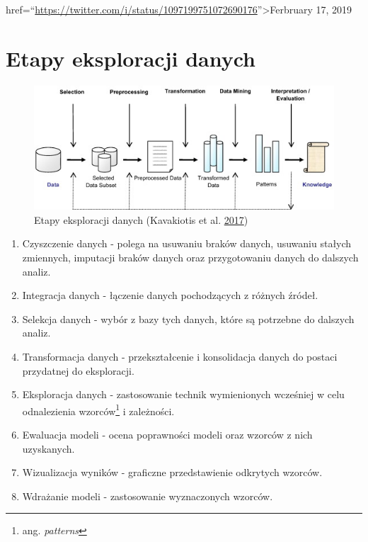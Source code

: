\documentclass[]{book}
\providecommand{\tightlist}{%
  \setlength{\itemsep}{0pt}\setlength{\parskip}{0pt}}
\let\rmarkdownfootnote\footnote%
\def\footnote{\protect\rmarkdownfootnote}
\theoremstyle{plain}
\theoremstyle{definition}
\theoremstyle{definition}
\theoremstyle{definition}
\theoremstyle{definition}
\theoremstyle{remark}
\begin{document}
href=``\url{https://twitter.com/i/status/1097199751072690176}''\textgreater{}Ferbruary 17, 2019

\hypertarget{etapy-eksploracji-danych}{%
\section*{Etapy eksploracji danych}\label{etapy-eksploracji-danych}}

\begin{figure}
\centering
\includegraphics{images/dm_stages.jpg}
\caption{\label{fig:unnamed-chunk-2}Etapy eksploracji danych (Kavakiotis et al. \protect\hyperlink{ref-kavakiotis2017}{2017})}
\end{figure}

\begin{enumerate}
\def\labelenumi{\arabic{enumi}.}
\tightlist
\item
  Czyszczenie danych - polega na usuwaniu braków danych, usuwaniu stałych zmiennych, imputacji braków danych oraz przygotowaniu danych do dalszych analiz.
\item
  Integracja danych - łączenie danych pochodzących z różnych źródeł.
\item
  Selekcja danych - wybór z bazy tych danych, które są potrzebne do dalszych analiz.
\item
  Transformacja danych - przekształcenie i konsolidacja danych do postaci przydatnej do eksploracji.
\item
  Eksploracja danych - zastosowanie technik wymienionych wcześniej w celu odnalezienia wzorców\footnote{ang. \emph{patterns}} i zależności.
\item
  Ewaluacja modeli - ocena poprawności modeli oraz wzorców z nich uzyskanych.
\item
  Wizualizacja wyników - graficzne przedstawienie odkrytych wzorców.
\item
  Wdrażanie modeli - zastosowanie wyznaczonych wzorców.
\end{enumerate}
\end{document}
